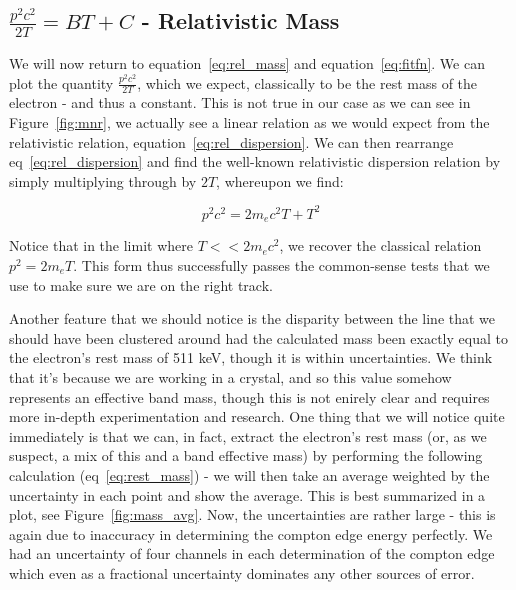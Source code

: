 \documentclass[reprint, nobibnotes, amssymb, amsmath, amsfonts, physics, mathtools, mathrsfs, floatfix]{revtex4-1}
\begin{document}
    \subsection{$\frac{p^2c^2}{2T} = BT + C$ - Relativistic Mass}
      We will now return to equation~\ref{eq:rel_mass} and equation~\ref{eq:fitfn}.  We can plot the quantity $\frac{p^2c^2}{2T}$, which we expect, classically to be the rest mass of the electron - and thus a constant.  This is not true in our case as we can see in Figure~\ref{fig:mnr}, we actually see a linear relation as we would expect from the relativistic relation, equation~\ref{eq:rel_dispersion}.  We can then rearrange eq~\ref{eq:rel_dispersion} and find the well-known relativistic dispersion relation by simply multiplying through by $2T$, whereupon we find:

      \begin{equation}
        p^2c^2 = 2m_ec^2T + T^2
      \end{equation}

      Notice that in the limit where $T << 2m_ec^2$, we recover the classical relation $p^2 = 2m_eT$.  This form thus successfully passes the common-sense tests that we use to make sure we are on the right track.

      \hspace{.25cm}

      Another feature that we should notice is the disparity between the line that we should have been clustered around had the calculated mass been exactly equal to the electron's rest mass of 511 keV, though it is within uncertainties.  We think that it's because we are working in a crystal, and so this value somehow represents an effective band mass, though this is not enirely clear and requires more in-depth experimentation and research.  One thing that we will notice quite immediately is that we can, in fact, extract the electron's rest mass (or, as we suspect, a mix of this and a band effective mass) by performing the following calculation (eq~\ref{eq:rest_mass}) - we will then take an average weighted by the uncertainty in each point and show the average.  This is best summarized in a plot, see Figure~\ref{fig:mass_avg}.  Now, the uncertainties are rather large - this is again due to inaccuracy in determining the compton edge energy perfectly.  We had an uncertainty of four channels in each determination of the compton edge which even as a fractional uncertainty dominates any other sources of error.

       \hspace{.25cm}
\end{document}

